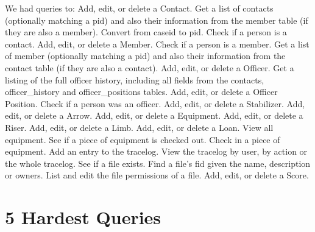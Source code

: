 \documentclass{article}
\begin{document}
We had queries to: \newline
Add, edit, or delete a Contact.  \newline
Get a list of contacts (optionally matching a pid) and also their information from the member table (if they are also a member). \newline
Convert from caseid to pid. \newline
Check if a person is a contact. \newline
Add, edit, or delete a Member. \newline
Check if a person is a member.  \newline
Get a list of member (optionally matching a pid) and also their information from the contact table (if they are also a contact). \newline
Add, edit, or delete a Officer.  \newline
Get a listing of the full officer history, including all fields from the contacts, officer\_history and officer\_positions tables. \newline
Add, edit, or delete a Officer Position. \newline
Check if a person was an officer. \newline
Add, edit, or delete a Stabilizer. \newline
Add, edit, or delete a Arrow. \newline
Add, edit, or delete a Equipment. \newline
Add, edit, or delete a Riser. \newline
Add, edit, or delete a Limb. \newline
Add, edit, or delete a Loan. \newline
View all equipment. \newline
See if a piece of equipment is checked out. \newline
Check in a piece of equipment. \newline
Add an entry to the tracelog. \newline
View the tracelog by user, by action or the whole tracelog. \newline
See if a file exists. \newline
Find a file's fid given the name, description or owners. \newline
List and edit the file permissions of a file. \newline
Add, edit, or delete a Score. \newline

\section{5 Hardest Queries}
\end{document}
